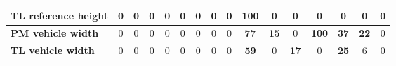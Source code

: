 \begin{table}[H]
\begin{tabular}{|l|c|c|c|c|c|c|c|c|c|c|c|c|c|c|c|}
\hline
\textcolor[rgb]{0.851, 0.373, 0.008}{\textbf{TL reference height}} & 0 & 0 & 0 & 0 & 0 & 0 & 0 & 0 & \textcolor[rgb]{0.835, 0.369, 0.000}{\textbf{100}} & 0 & 0 & 0 & 0 & 0 & 0 \\
\hline
\textcolor[rgb]{0.851, 0.373, 0.008}{\textbf{PM vehicle width}} & 0 & 0 & 0 & 0 & 0 & 0 & 0 & 0 & \textcolor[rgb]{0.000, 0.447, 0.698}{\textbf{77}} & \textbf{15} & 0 & \textcolor[rgb]{0.835, 0.369, 0.000}{\textbf{100}} & \textcolor[rgb]{0.000, 0.620, 0.451}{\textbf{37}} & \textbf{22} & 0 \\
\hline
\textcolor[rgb]{0.000, 0.447, 0.698}{\textbf{TL vehicle width}} & 0 & 0 & 0 & 0 & 0 & 0 & 0 & 0 & \textcolor[rgb]{0.000, 0.447, 0.698}{\textbf{59}} & 0 & \textbf{17} & 0 & \textcolor[rgb]{0.000, 0.620, 0.451}{\textbf{25}} & 6 & 0 \\
\hline

\end{tabular}%
\end{table}%



